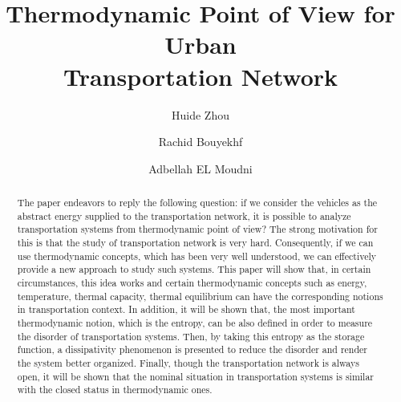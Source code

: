 \documentclass[preprint,authoryear,12pt]{elsarticle}
\begin{document}
\begin{frontmatter}

\title{Thermodynamic Point of View for Urban\\ Transportation Network}
\author[SeT]{Huide Zhou}
\author[SeT]{Rachid Bouyekhf}
\author[SeT]{Adbellah EL Moudni}
\address[SeT]{Laboratoire Syst\`{e}mes et Transports (SeT),\\
Universit\'{e} de Technologie de Belfort-Montb\'{e}liard (UTBM)\\
Rue Thierry Mieg, 90010 Belfort Cedex, France}

\begin{abstract}
The paper endeavors to reply the following question: if we consider the vehicles as the abstract energy supplied to the transportation network, it is possible to analyze transportation systems from thermodynamic point of view? The strong motivation for this is that the study of transportation network is very hard. Consequently, if we can use thermodynamic concepts, which has been very well understood, we can effectively provide a new approach to study such systems.
This paper will show that, in certain circumstances, this idea works and certain thermodynamic concepts such as energy, temperature, thermal capacity, thermal equilibrium can have the corresponding notions in transportation context. In addition, it will be shown that, the most important thermodynamic notion, which is the entropy, can be also defined in order to measure the disorder of transportation systems. Then, by taking this entropy as the storage function, a dissipativity phenomenon is presented to reduce the disorder and render the system better organized. Finally, though the transportation network is always open, it will be shown that the nominal situation in transportation systems is similar with the closed status in thermodynamic ones.
\end{abstract}


\end{frontmatter}
\end{document}

